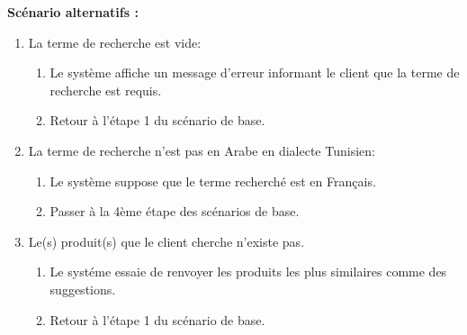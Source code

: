 \textbf{Scénario alternatifs : }
\begin{enumerate}
	\item La terme de recherche est vide:
	      \begin{enumerate}
		      \item Le système affiche un message d'erreur informant le client que la terme de recherche est requis.
		      \item Retour à l'étape 1 du scénario de base.
	      \end{enumerate}
	\item La terme de recherche n'est pas en Arabe en dialecte Tunisien:
	      \begin{enumerate}
		      \item Le système suppose que le terme recherché est en Français.
		      \item Passer à la 4ème étape des scénarios de base.
	      \end{enumerate}

	\item Le(s) produit(s) que le client cherche n'existe pas.
	      \begin{enumerate}
		      \item Le systéme essaie de renvoyer les produits les plus similaires comme des suggestions.
		      \item Retour à l'étape 1 du scénario de base.
	      \end{enumerate}
\end{enumerate}